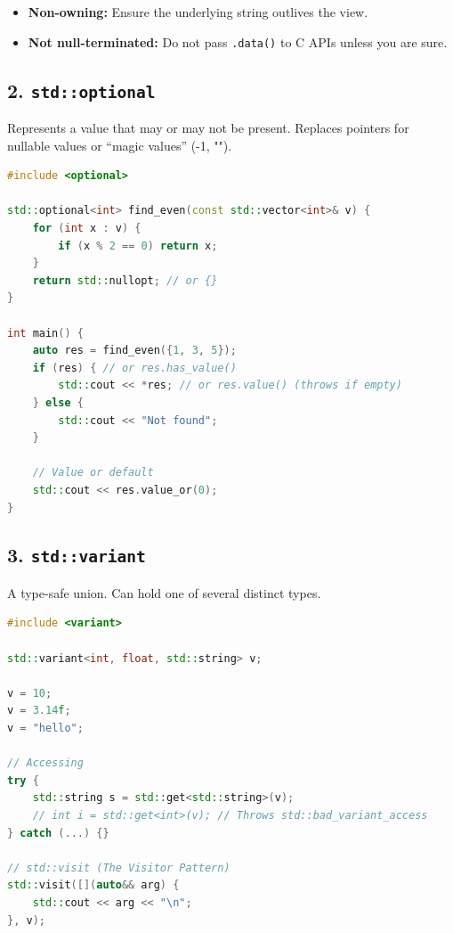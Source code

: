\begin{itemize}
\tightlist
\item
  \textbf{Non-owning:} Ensure the underlying string outlives the view.
\item
  \textbf{Not null-terminated:} Do not pass
  \passthrough{\lstinline!.data()!} to C APIs unless you are sure.
\end{itemize}

\hypertarget{stdoptional}{%
\subsection{\texorpdfstring{2.
\texttt{std::optional}}{2. std::optional}}\label{stdoptional}}

Represents a value that may or may not be present. Replaces pointers for
nullable values or ``magic values'' (-1, "").

\begin{lstlisting}[language={C++}]
#include <optional>

std::optional<int> find_even(const std::vector<int>& v) {
    for (int x : v) {
        if (x % 2 == 0) return x;
    }
    return std::nullopt; // or {}
}

int main() {
    auto res = find_even({1, 3, 5});
    if (res) { // or res.has_value()
        std::cout << *res; // or res.value() (throws if empty)
    } else {
        std::cout << "Not found";
    }

    // Value or default
    std::cout << res.value_or(0);
}
\end{lstlisting}

\hypertarget{stdvariant}{%
\subsection{\texorpdfstring{3.
\texttt{std::variant}}{3. std::variant}}\label{stdvariant}}

A type-safe union. Can hold one of several distinct types.

\begin{lstlisting}[language={C++}]
#include <variant>

std::variant<int, float, std::string> v;

v = 10;
v = 3.14f;
v = "hello";

// Accessing
try {
    std::string s = std::get<std::string>(v);
    // int i = std::get<int>(v); // Throws std::bad_variant_access
} catch (...) {}

// std::visit (The Visitor Pattern)
std::visit([](auto&& arg) {
    std::cout << arg << "\n";
}, v);
\end{lstlisting}

